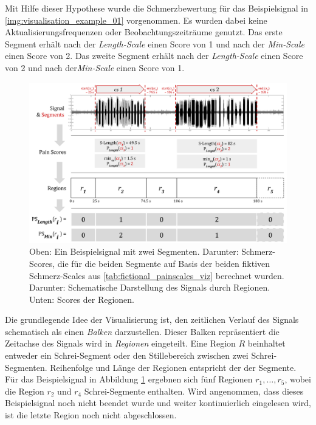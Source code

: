 Mit Hilfe dieser Hypothese wurde die Schmerzbewertung für das Beispielsignal in \autoref{img:visualisation_example_01} vorgenommen. Es wurden dabei keine Aktualisierungsfrequenzen oder Beobachtungszeiträume genutzt. Das erste Segment erhält nach der \emph{Length-Scale} einen Score von 1 und nach der \emph{Min-Scale} einen Score von 2. Das zweite Segment erhält nach der \emph{Length-Scale} einen Score von 2 und nach der\emph{Min-Scale} einen Score von 1.

\begin{figure}[h]
	\centering
	\includegraphics[width=1\textwidth]{bilder/visualisation_example_01.png}
	\caption[Einteilung eines Signals in Regionen zur Vorbereitung der Visualisierung]{Oben: Ein Beispielsignal mit zwei Segmenten. Darunter: Schmerz-Scores, die für die beiden Segmente auf Basis der beiden fiktiven Schmerz-Scales aus \autoref{tab:fictional_painscales_viz} berechnet wurden. Darunter: Schematische Darstellung des Signals durch Regionen. Unten: Scores der Regionen.}
	\label{img:visualisation_example_01}
\end{figure}

Die grundlegende Idee der Visualisierung ist, den zeitlichen Verlauf des Signals schematisch als einen \emph{Balken} darzustellen. Dieser Balken repräsentiert die Zeitachse des Signals wird in \emph{Regionen} eingeteilt. Eine Region $R$ beinhaltet entweder ein Schrei-Segment oder den Stillebereich zwischen zwei Schrei-Segmenten. Reihenfolge und Länge der Regionen entspricht der der Segmente. Für das Beispielsignal in Abbildung \ref{img:visualisation_example_01} ergebnen sich fünf Regionen $r_{1} , \ldots , r_5 $, wobei die Region $r_2$ und $r_4$ Schrei-Segmente enthalten. Wird angenommen, dass dieses Beispielsignal noch nicht beendet wurde und weiter kontinuierlich eingelesen wird, ist die letzte Region noch nicht abgeschlossen.

